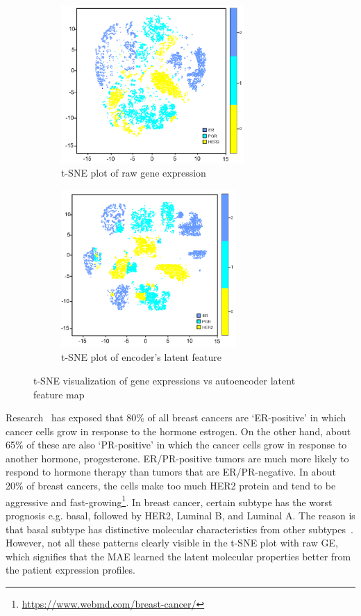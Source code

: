 \begin{figure}[h]
	\centering
	\begin{subfigure}{.48\linewidth}
		\centering
		\includegraphics[width=\linewidth,height=60mm]{images/raw_tsne.png}
		\caption{t-SNE plot of raw gene expression}
        \label{fig:tsne_raw}
	\end{subfigure}
	\begin{subfigure}{0.48\linewidth}
		\centering
		\includegraphics[width=\linewidth,height=60mm]{images/ae_tsne.png}
		\caption{t-SNE plot of encoder's latent feature}
        \label{fig:tsne_ae}
	\end{subfigure}
	 \setlength{\belowcaptionskip}{-8pt}
	\caption{t-SNE visualization of gene expressions vs autoencoder latent feature map~\cite{karimACCESS2019}} 
	\label{fig:tnse}
\end{figure}

\hspace*{3.5mm} Research~\cite{91Caruana} has exposed that 80\% of all breast cancers are `ER-positive' in which cancer cells grow in response to the hormone estrogen. On the other hand, about 65\% of these are also `PR-positive' in which the cancer cells grow in response to another hormone, progesterone. ER/PR-positive tumors are much more likely to respond to hormone therapy than tumors that are ER/PR-negative. In about 20\% of breast cancers, the cells make too much HER2 protein and tend to be aggressive and fast-growing\footnote{\url{https://www.webmd.com/breast-cancer/}}. In breast cancer, certain subtype has the worst prognosis e.g. basal, followed by HER2, Luminal B, and Luminal A. The reason is that basal subtype has distinctive molecular characteristics from other subtypes~\cite{bertucci2012basal}. However, not all these patterns clearly visible in the t-SNE plot with raw GE, which signifies that the MAE learned the latent molecular properties better from the patient expression profiles.


